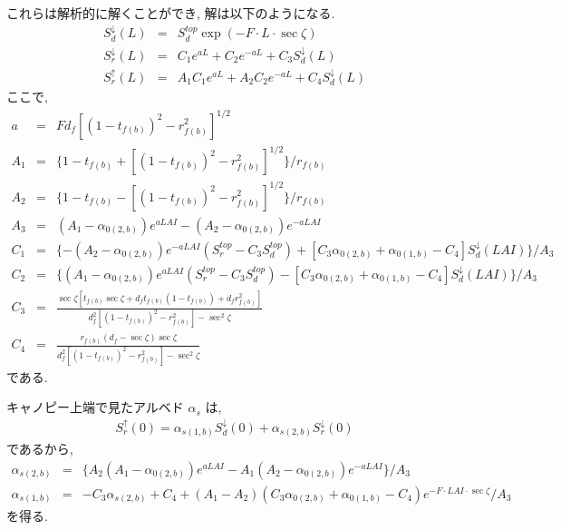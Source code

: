 これらは解析的に解くことができ, 解は以下のようになる.
\begin{eqnarray}
 S^{\downarrow}_d(L) &=& S^{top}_d \exp(-F\cdot L\cdot \sec\zeta) \\
 S^{\downarrow}_r(L) &=& C_1 e^{a L} + C_2 e^{-a L} + C_3 S^{\downarrow}_d(L) \\
 S^{\uparrow}_r(L)   &=& A_1 C_1 e^{a L} + A_2 C_2 e^{-a L} + C_4 S^{\downarrow}_d(L)
\end{eqnarray}
ここで,
\begin{eqnarray}
   a &=& F d_f [(1-t_{f(b)})^2 - r_{f(b)}^2]^{1/2} \label{atn} \\
 A_1 &=& \{ 1 - t_{f(b)} + [(1-t_{f(b)})^2 - r_{f(b)}^2]^{1/2}\} / r_{f(b)} \\
 A_2 &=& \{ 1 - t_{f(b)} - [(1-t_{f(b)})^2 - r_{f(b)}^2]^{1/2}\} / r_{f(b)} \\
 A_3 &=& (A_1 - \alpha_{0(2,b)}) e^{ a LAI }
        -(A_2 - \alpha_{0(2,b)}) e^{-a LAI } \\
 C_1 &=& \{ -(A_2 - \alpha_{0(2,b)}) e^{-a LAI} (S^{top}_r - C_3 S^{top}_d)
            +[C_3\alpha_{0(2,b)}+\alpha_{0(1,b)}-C_4]S^{\downarrow}_d(LAI)\} / A_3 \\
 C_2 &=& \{  (A_1 - \alpha_{0(2,b)}) e^{ a LAI} (S^{top}_r - C_3 S^{top}_d)
            -[C_3\alpha_{0(2,b)}+\alpha_{0(1,b)}-C_4]S^{\downarrow}_d(LAI)\} / A_3 \\
 C_3 &=& \frac{\sec\zeta[t_{f(b)}\sec\zeta + d_f t_{f(b)}(1-t_{f(b)}) + d_f r_{f(b)}^2]}
              {d_f^2[(1-t_{f(b)})^2-r_{f(b)}^2]-\sec^2\zeta} \\
 C_4 &=& \frac{r_{f(b)}(d_f - \sec\zeta)\sec\zeta}
              {d_f^2[(1-t_{f(b)})^2-r_{f(b)}^2]-\sec^2\zeta}
\end{eqnarray}
である.

キャノピー上端で見たアルベド $\alpha_s$ は,
\begin{eqnarray}
 S^{\uparrow}_r(0) = \alpha_{s(1,b)} S^{\downarrow}_d(0)
                   + \alpha_{s(2,b)} S^{\downarrow}_r(0)
\end{eqnarray}
であるから,
\begin{eqnarray}
 \alpha_{s(2,b)} &=& \{ A_2 ( A_1 - \alpha_{0(2,b)}) e^{ a LAI }
                      - A_1 ( A_2 - \alpha_{0(2,b)}) e^{-a LAI }
                   \} / A_3 \\
 \alpha_{s(1,b)} &=& - C_3 \alpha_{s(2,b)} + C_4
                  + ( A_1 - A_2 ) ( C_3 \alpha_{0(2,b)} + \alpha_{0(1,b)} -C_4)
                  e^{- F\cdot LAI\cdot \sec\zeta} / A_3
\end{eqnarray}
を得る.

